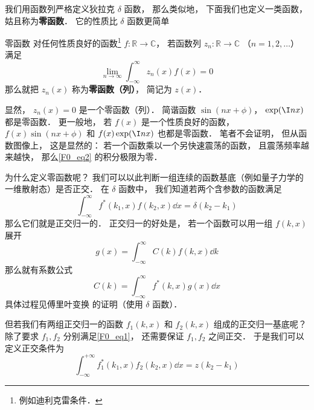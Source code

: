 
\begin{issues}
\issueDraft
{}
\end{issues}

我们用函数列严格定义狄拉克 $\delta$ 函数， 那么类似地， 下面我们也定义一类函数， 姑且称为\textbf{零函数}． 它的性质比 $\delta$ 函数更简单
\begin{definition}{零函数}
对任何性质良好的函数\footnote{例如迪利克雷条件．} $f: \mathbb R \to \mathbb C$， 若函数列 $z_n: \mathbb R \to \mathbb C$ （$n = 1, 2, \dots$） 满足
\begin{equation}\label{F0_eq2}
\lim_{n\to \infty}\int_{-\infty}^{\infty} z_n(x) f(x) = 0
\end{equation}
那么就把 $z_n(x)$ 称为\textbf{零函数（列）}， 简记为 $z(x)$．
\end{definition}

\begin{example}{}
显然， $z_n(x) = 0$ 是一个零函数（列）． 简谐函数 $\sin(nx + \phi)$， $\exp(\I n x)$ 都是零函数． 更一般地， 若 $f(x)$ 是一个性质良好的函数， $f(x)\sin(nx + \phi)$ 和 $f(x)\exp(\I n x)$ 也都是零函数． 笔者不会证明， 但从函数图像上， 这是显然的： 若一个函数乘以一个另快速震荡的函数， 且震荡频率越来越快， 那么\autoref{F0_eq2} 的积分极限为零．
\end{example}

为什么定义零函数呢？ 我们可以以此判断一组连续的函数基底（例如量子力学的一维散射态）是否正交． 在 $\delta$ 函数中， 我们知道若两个含参数的函数满足
\begin{equation}\label{F0_eq1}
\int_{-\infty}^{\infty} f^*(k_1, x) f(k_2, x)\dd{x} = \delta(k_2 - k_1)
\end{equation}
那么它们就是正交归一的． 正交归一的好处是， 若一个函数可以用一组 $f(k, x)$ 展开
\begin{equation}
g(x) = \int_{-\infty}^{\infty} C(k) f(k, x) \dd{k}
\end{equation}
那么就有系数公式
\begin{equation}
C(k) = \int_{-\infty}^{\infty} f^*(k, x)g(x)\dd{x}
\end{equation}
具体过程见傅里叶变换 的证明（使用 $\delta$ 函数）．

但若我们有两组正交归一的函数 $f_1(k, x)$ 和 $f_2(k, x)$ 组成的正交归一基底呢？ 除了要求 $f_1, f_2$ 分别满足\autoref{F0_eq1}， 还需要保证 $f_1, f_2$ 之间正交． 于是我们可以定义正交条件为
\begin{equation}
\int_{-\infty}^{+\infty} f_1^*(k_1, x) f_2(k_2, x) \dd{x} = z(k_2 - k_1)
\end{equation}

